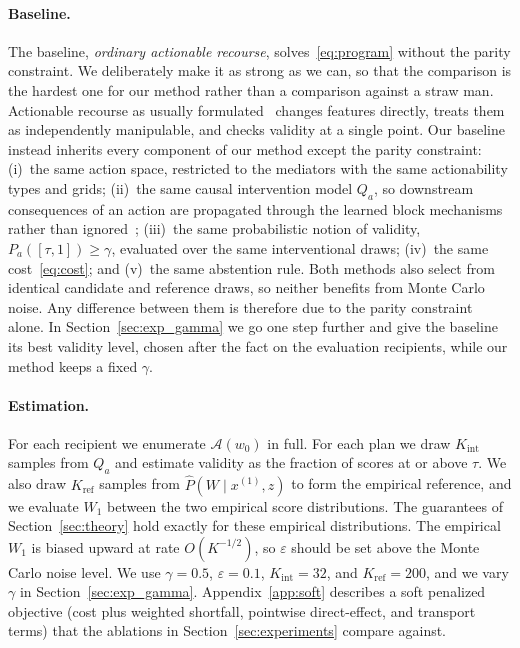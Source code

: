 \paragraph{Baseline.}
The baseline, \emph{ordinary actionable recourse}, solves~\eqref{eq:program}
without the parity constraint. We deliberately make it as strong as we can,
so that the comparison is the hardest one for our method rather than a
comparison against a straw man. Actionable recourse as usually
formulated~\citep{ustun2019actionable} changes features directly, treats them
as independently manipulable, and checks validity at a single point. Our
baseline instead inherits every component of our method except the parity
constraint:
(i)~the same action space, restricted to the mediators with the same
actionability types and grids;
(ii)~the same causal intervention model $Q_a$, so downstream consequences of
an action are propagated through the learned block mechanisms rather than
ignored~\citep{karimi2021algorithmic};
(iii)~the same probabilistic notion of validity, $P_a([\tau,1])\ge\gamma$,
evaluated over the same interventional draws;
(iv)~the same cost~\eqref{eq:cost}; and
(v)~the same abstention rule.
Both methods also select from identical candidate and reference draws, so
neither benefits from Monte Carlo noise. Any difference between them is
therefore due to the parity constraint alone. In
Section~\ref{sec:exp_gamma} we go one step further and give the baseline its
best validity level, chosen after the fact on the evaluation recipients,
while our method keeps a fixed $\gamma$.

\paragraph{Estimation.}
For each recipient we enumerate $\mathcal A(w_0)$ in full. For each plan we draw
$K_{\mathrm{int}}$ samples from $Q_a$ and estimate validity as the fraction of
scores at or above $\tau$. We also draw $K_{\mathrm{ref}}$ samples from
$\hat P(W\mid x^{(1)},z)$ to form the empirical reference, and we evaluate
$W_1$ between the two empirical score distributions. The guarantees of
Section~\ref{sec:theory} hold exactly for these empirical distributions. The
empirical $W_1$ is biased upward at rate $O(K^{-1/2})$, so $\varepsilon$ should
be set above the Monte Carlo noise level. We use $\gamma=0.5$, $\varepsilon=0.1$,
$K_{\mathrm{int}}=32$, and $K_{\mathrm{ref}}=200$, and we vary $\gamma$ in
Section~\ref{sec:exp_gamma}.
Appendix~\ref{app:soft} describes a soft penalized objective (cost plus
weighted shortfall, pointwise direct-effect, and transport terms) that the
ablations in Section~\ref{sec:experiments} compare against.

